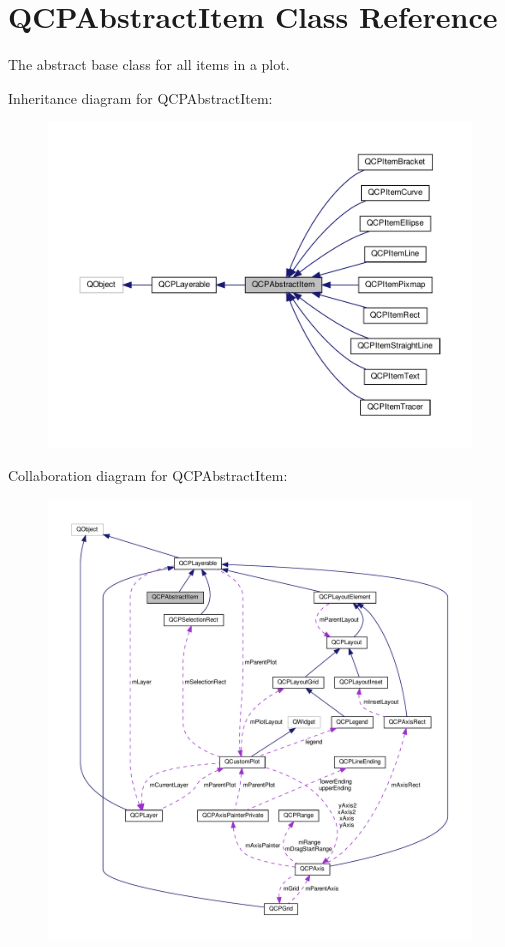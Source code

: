 \hypertarget{classQCPAbstractItem}{}\section{Q\+C\+P\+Abstract\+Item Class Reference}
\label{classQCPAbstractItem}


The abstract base class for all items in a plot.  




Inheritance diagram for Q\+C\+P\+Abstract\+Item\+:\nopagebreak
\begin{figure}[H]
\begin{center}
\leavevmode
\includegraphics[width=350pt]{classQCPAbstractItem__inherit__graph}
\end{center}
\end{figure}


Collaboration diagram for Q\+C\+P\+Abstract\+Item\+:\nopagebreak
\begin{figure}[H]
\begin{center}
\leavevmode
\includegraphics[width=350pt]{classQCPAbstractItem__coll__graph}
\end{center}
\end{figure}
